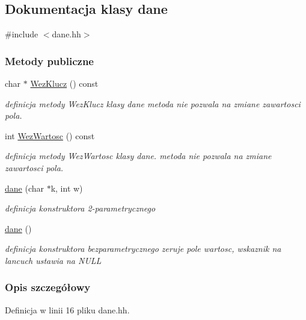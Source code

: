 \hypertarget{classdane}{}\subsection{Dokumentacja klasy dane}
\label{classdane}


{\ttfamily \#include $<$dane.\+hh$>$}

\subsubsection*{Metody publiczne}
\begin{DoxyCompactItemize}
\item 
char $\ast$ \hyperlink{classdane_a8fd41a54eb1cd6204e3ce1785ebb0413}{Wez\+Klucz} () const 
\begin{DoxyCompactList}\small\item\em definicja metody Wez\+Klucz klasy dane metoda nie pozwala na zmiane zawartosci pola. \end{DoxyCompactList}\item 
int \hyperlink{classdane_ad0fb107a74bafb30cff8bde81709403f}{Wez\+Wartosc} () const 
\begin{DoxyCompactList}\small\item\em definicja metody Wez\+Wartosc klasy dane. metoda nie pozwala na zmiane zawartosci pola. \end{DoxyCompactList}\item 
\hyperlink{classdane_a5cee48299360f96fe88622503a38e376}{dane} (char $\ast$k, int w)
\begin{DoxyCompactList}\small\item\em definicja konstruktora 2-\/parametrycznego \end{DoxyCompactList}\item 
\hyperlink{classdane_a680f7dc64c0fae8532539e51195fd2ff}{dane} ()
\begin{DoxyCompactList}\small\item\em definicja konstruktora bezparametrycznego zeruje pole wartosc, wskaznik na lancuch ustawia na N\+U\+L\+L \end{DoxyCompactList}\end{DoxyCompactItemize}


\subsubsection{Opis szczegółowy}


Definicja w linii 16 pliku dane.\+hh.



